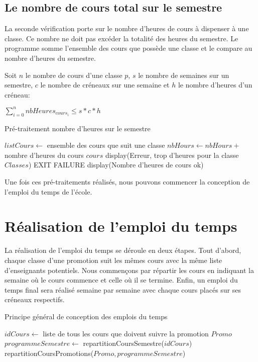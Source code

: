 \documentclass[12pt,a4paper,french]{article}
\begin{document}
\newpage

\subsection{Le nombre de cours total sur le semestre}
La seconde vérification porte sur le nombre d'heures de cours à dispenser à une classe. Ce nombre ne doit pas excéder la totalité des heures du semestre. Le programme somme l'ensemble des cours que possède une classe et le compare au nombre d'heures du semestre.

Soit $n$ le nombre de cours d'une classe $p$, $s$ le nombre de semaines sur un semestre, $c$ le nombre de créneaux sur une semaine et $h$ le nombre d'heures d'un créneau: 

\begin{center}
$\sum_{i=0}^n nbHeures_{cours_i} \leq s*c*h$
\end{center}

\begin{algorithm}
\caption{Pré-traitement nombre d'heures sur le semestre}
\begin{algorithmic}
\STATE $listCours \leftarrow$ ensemble des cours que suit une classe
\STATE $nbHours \leftarrow nbHours +$ nombre d'heures du cours $cours$
\ENDFOR
{}
\STATE display(Erreur, trop d'heures pour la classe $Classes$)
\STATE EXIT FAILURE
\ENDIF
\ENDFOR
\STATE display(Nombre d'heures de cours ok)
\end{algorithmic}
\end{algorithm}

Une fois ces pré-traitements réalisés, nous pouvons commencer la conception de l'emploi du temps de l'école.

\newpage
\section{Réalisation de l'emploi du temps}
La réalisation de l'emploi du temps se déroule en deux étapes. Tout d'abord, chaque classe d'une promotion suit les mêmes cours avec la même liste d'enseignants potentiels. Nous commençons par répartir les cours en indiquant la semaine où le cours commence et celle où il se termine. 
Enfin, un emploi du temps final sera réalisé semaine par semaine avec chaque cours placés sur ses créneaux respectifs.

\begin{algorithm}
\caption{Principe général de conception des emplois du temps}
\begin{algorithmic}
\STATE $idCours \leftarrow$ liste de tous les cours que doivent suivre la promotion $Promo$
\STATE $programmeSemestre \leftarrow $ repartitionCoursSemestre($idCours$)
\STATE repartitionCoursPromotions($Promo, programmeSemestre$)
\ENDFOR
\end{algorithmic}
\end{algorithm}
\end{document}
